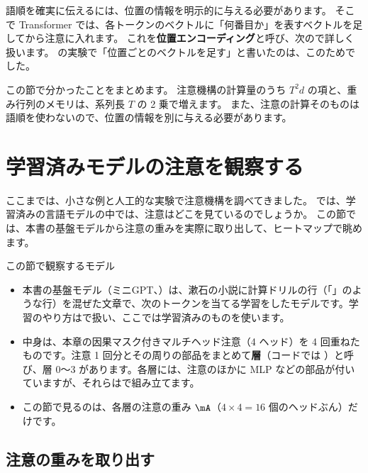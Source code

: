 語順を確実に伝えるには、位置の情報を明示的に与える必要があります。
そこで Transformer では、各トークンのベクトルに「何番目か」を表すベクトルを足してから注意に入れます。
これを\textbf{位置エンコーディング}と呼び、次ので詳しく扱います。
の実験で「位置ごとのベクトルを足す」と書いたのは、このためでした。

この節で分かったことをまとめます。
注意機構の計算量のうち $T^2d$ の項と、重み行列のメモリは、系列長 $T$ の 2 乗で増えます。
また、注意の計算そのものは語順を使わないので、位置の情報を別に与える必要があります。

\section{学習済みモデルの注意を観察する}\label{sec:attn-visualize}

ここまでは、小さな例と人工的な実験で注意機構を調べてきました。
では、学習済みの言語モデルの中では、注意はどこを見ているのでしょうか。
この節では、本書の基盤モデルから注意の重みを実際に取り出して、ヒートマップで眺めます。

\begin{intuition}{この節で観察するモデル}
\begin{itemize}[leftmargin=1.2em]
\item 本書の基盤モデル（ミニGPT、）は、漱石の小説に計算ドリルの行（「」のような行）を混ぜた文章で、次のトークンを当てる学習をしたモデルです。学習のやり方はで扱い、ここでは学習済みのものを使います。
\item 中身は、本章の因果マスク付きマルチヘッド注意（4 ヘッド）を 4 回重ねたものです。注意 1 回分とその周りの部品をまとめて\textbf{層}（コードでは ）と呼び、層 0〜3 があります。各層には、注意のほかに MLP などの部品が付いていますが、それらはで組み立てます。
\item この節で見るのは、各層の注意の重み $\mA$（$4\times4=16$ 個のヘッドぶん）だけです。
\end{itemize}
\end{intuition}

\subsection*{注意の重みを取り出す}


